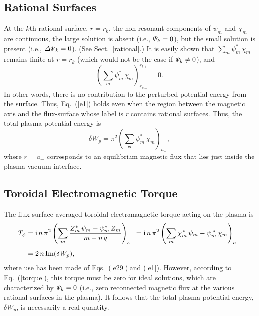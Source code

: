 \documentclass[12pt,prb,aps]{revtex4-1}
\begin{document}
\subsection{Rational Surfaces}
At the $k$th rational surface, $r=r_k$, the non-resonant components of $\psi_m$ and $\chi_m$ are continuous,  the 
large solution is absent (i.e., ${\mit\Psi}_k=0$), but the small solution is present  (i.e., ${\mit\Delta\Psi}_k=0$). (See Sect.~\ref{rational}.)
It is easily shown that $\sum_m \psi_m^\ast\,\chi_m$ remains finite at $r=r_k$ (which would not be the case if ${\mit\Psi}_k\neq 0$), and\,\cite{tj}
\begin{equation}
\left(\sum_m\psi_m^\ast\,\chi_m\right)_{r_{k-}}^{r_{k+}}=0.
\end{equation}
In other words, there is no contribution to the perturbed potential energy from the surface. Thus, Eq.~(\ref{e1}) holds even when the region between the
magnetic axis and the flux-surface whose label is $r$ contains rational surfaces. 
Thus, the total plasma potential energy is 
\begin{equation}\label{a32}
\delta W_p =\pi^2\left(\sum_m\psi_m^\ast\,\chi_m\right)_{a_-},
\end{equation}
where $r=a_-$ corresponds to an equilibrium magnetic flux that lies just inside the plasma-vacuum interface. 

\subsection{Toroidal Electromagnetic Torque}
The flux-surface averaged toroidal electromagnetic torque acting on the plasma   is\,\cite{tj,ideal}
\begin{align}\label{b27}
T_\phi& = {\rm i}\,n\,\pi^2\left(\sum_m\frac{Z_m^\ast\,\psi_m-\psi_m^\ast\,Z_m}{m-n\,q}\right)_{a_-}= {\rm i}\,n\,\pi^2\left(\sum_m
\chi_m^{\,\ast}\,\psi_m - \psi_m^{\,\ast}\,\chi_m\right)_{a_-}\nonumber\\[0.5ex]
&= 2\,n\,{\rm Im}(\delta W_p),
\end{align}
where use has been made of Eqs.~(\ref{e29}) and (\ref{e1}). 
However, according to Eq.~(\ref{torque}), this torque must be zero for ideal solutions, which are characterized by ${\mit\Psi}_k=0$ (i.e., zero reconnected magnetic
flux at the various rational surfaces in the plasma).\cite{tj}
It follows that
 the total plasma potential energy, $\delta W_p$, is necessarily a real quantity. 
 
\end{document}
